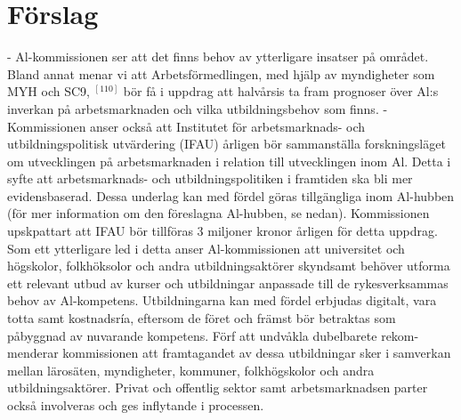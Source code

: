 {{{{{{{{{{{{\section*{Förslag}
- Al-kommissionen ser att det finns behov av ytterligare insatser på området. Bland annat menar vi att Arbetsförmedlingen, med hjälp av myndigheter som MYH och SC9, \({ }^{[110]}\) bör få i uppdrag att halvårsis ta fram prognoser över Al:s inverkan på arbetsmarknaden och vilka utbildningsbehov som finns.
- Kommissionen anser också att Institutet för arbetsmarknads- och utbildningspolitisk utvärdering (IFAU) årligen bör sammanställa forskningsläget om utvecklingen på arbetsmarknaden i relation till utvecklingen inom Al. Detta i syfte att arbetsmarknads- och utbildningspolitiken i framtiden ska bli mer evidensbaserad. Dessa underlag kan med fördel göras tillgängliga inom Al-hubben (för mer information om den föreslagna Al-hubben, se nedan). Kommissionen upskpattart att IFAU bör tillföras 3 miljoner kronor årligen för detta uppdrag.
Som ett ytterligare led i detta anser Al-kommissionen att universitet och högskolor, folkhöksolor och andra utbildningsaktörer skyndsamt behöver utforma ett relevant utbud av kurser och utbildningar anpassade till de rykesverksammas behov av Al-kompetens. Utbildningarna kan med fördel erbjudas digitalt, vara totta samt kostnadsría, eftersom de föret och främst bör betraktas som påbyggnad av nuvarande kompetens. Förf att undvåkla dubelbarete rekom- menderar kommissionen att framtagandet av dessa utbildningar sker i samverkan mellan lärosäten, myndigheter, kommuner, folkhögskolor och andra utbildningsaktörer. Privat och offentlig sektor samt arbetsmarknadsen parter också involveras och ges inflytande i processen.
}}}}}}}}}}}}
